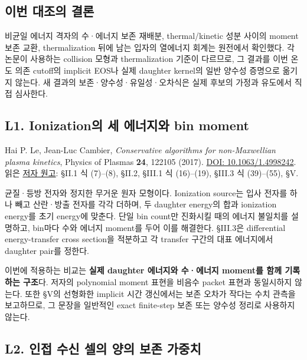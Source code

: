 \documentclass[11pt,a4paper]{article}
\begin{document}
\hypertarget{uxc774uxbc88-uxb300uxc870uxc758-uxacb0uxb860}{%
\subsection{이번 대조의 결론}\label{uxc774uxbc88-uxb300uxc870uxc758-uxacb0uxb860}}

비균일 에너지 격자의 수·에너지 보존 재배분, thermal/kinetic 성분 사이의 moment 보존 교환, thermalization 뒤에 남는 입자의 열에너지 회계는 원전에서 확인했다. 각 논문이 사용하는 collision 모형과 thermalization 기준이 다르므로, 그 결과를 이번 온도 의존 cutoff의 implicit EOS나 실제 daughter kernel의 일반 양수성 증명으로 옮기지 않는다. 새 결과의 보존·양수성·유일성·오차식은 실제 후보의 가정과 유도에서 직접 심사한다.

\hypertarget{l1.-ionizationuxc758-uxc138-uxc5d0uxb108uxc9c0uxc640-bin-moment}{%
\subsection{L1. Ionization의 세 에너지와 bin moment}\label{l1.-ionizationuxc758-uxc138-uxc5d0uxb108uxc9c0uxc640-bin-moment}}

Hai P. Le, Jean-Luc Cambier, \emph{Conservative algorithms for non-Maxwellian plasma kinetics}, Physics of Plasmas \textbf{24}, 122105 (2017). \href{https://doi.org/10.1063/1.4998242}{DOI: 10.1063/1.4998242}. 읽은 \href{https://ar5iv.labs.arxiv.org/html/1711.05946}{저자 원고}: §II.1 식 (7)--(8), §II.2, §III.1 식 (16)--(19), §III.3 식 (39)--(55), §V.

균질·등방 전자와 정지한 무거운 원자 모형이다. Ionization source는 입사 전자를 하나 빼고 산란·방출 전자를 각각 더하며, 두 daughter energy의 합과 ionization energy를 초기 energy에 맞춘다. 단일 bin count만 진화시킬 때의 에너지 불일치를 설명하고, bin마다 수와 에너지 moment를 두어 이를 해결한다. §III.3은 differential energy-transfer cross section을 적분하고 각 transfer 구간의 대표 에너지에서 daughter pair를 정한다.

이번에 적용하는 비교는 \textbf{실제 daughter 에너지와 수·에너지 moment를 함께 기록하는 구조}다. 저자의 polynomial moment 표현을 비음수 packet 표현과 동일시하지 않는다. 또한 §V의 선형화한 implicit 시간 갱신에서는 보존 오차가 작다는 수치 관측을 보고하므로, 그 문장을 일반적인 exact finite-step 보존 또는 양수성 정리로 사용하지 않는다.

\hypertarget{l2.-uxc778uxc811-uxc218uxc2e0-uxc140uxc758-uxc591uxc758-uxbcf4uxc874-uxac00uxc911uxce58}{%
\subsection{L2. 인접 수신 셀의 양의 보존 가중치}\label{l2.-uxc778uxc811-uxc218uxc2e0-uxc140uxc758-uxc591uxc758-uxbcf4uxc874-uxac00uxc911uxce58}}
\end{document}
